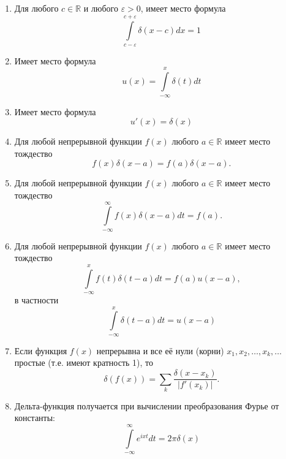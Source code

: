 \begin{prop}\-
\label{prop:13.5}
\begin{enumerate}
	\item  Для любого $c \in \mathbb{R}$ и любого $\varepsilon > 0$, имеет место формула
\begin{equation*}
	\int\limits_{c-\varepsilon}^{c+\varepsilon}\delta(x-c)dx=1
\end{equation*}
	\item Имеет место формула \begin{equation*}
		u(x)=\int\limits_{-\infty}^x\delta(t)dt
	\end{equation*}
	\item Имеет место формула \begin{equation*}
		u'(x)=\delta(x)
	\end{equation*}
	\item Для любой непрерывной функции $f(x)$ любого $a \in \mathbb{R}$ имеет место тождество
	\begin{equation*}
		f(x)\delta(x-a)=f(a)\delta(x-a).
	\end{equation*}
	\item Для любой непрерывной функции $f(x)$ любого $a \in \mathbb{R}$ имеет место тождество
	\begin{equation*}
		\int\limits_{-\infty}^{\infty}f(x)\delta(x-a)dt=f(a).
	\end{equation*}
	\item Для любой непрерывной функции $f(x)$ любого $a \in \mathbb{R}$ имеет место тождество
	\begin{equation*}
		\int\limits_{-\infty}^xf(t)\delta(t-a)dt=f(a)u(x-a),
	\end{equation*}
	в частности
	\begin{equation*}
		\int\limits_{-\infty}^x\delta(t-a)dt=u(x-a)
	\end{equation*}
	\item Если функция $f(x)$ непрерывна и все её нули (корни) $x_1, x_2,\dots , x_k, \dots$ простые (т.е. имеют кратность 1), то
	\begin{equation*}
		\delta(f(x))=\sum\limits_k\frac{\delta(x-x_k)}{|f'(x_k)|}.
	\end{equation*}
	\item Дельта-функция получается при вычислении преобразования Фурье
	от константы:
	\begin{equation*}
		\int\limits_{-\infty}^{\infty}e^{ixt}dt=2\pi \delta(x)
	\end{equation*}
\end{enumerate}
\end{prop}

